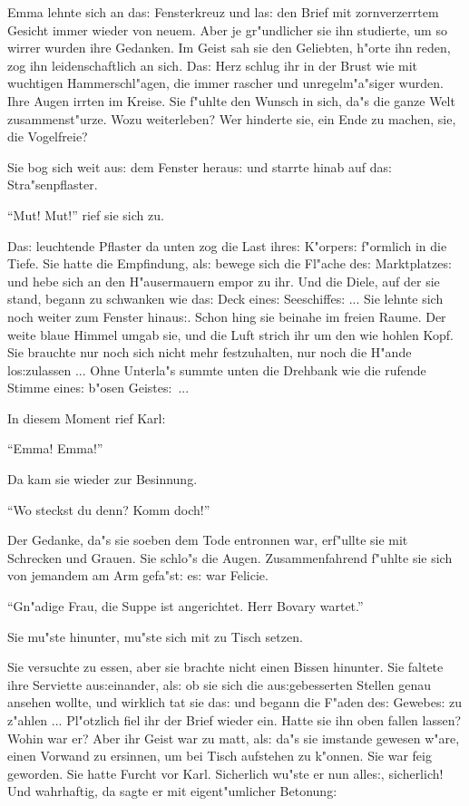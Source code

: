 \documentclass[oneside,12pt]{book}
\newcommand{\s}{s:}%
\begin{document}
Emma lehnte sich an da{\s} Fensterkreuz und la{\s} den Brief mit
zornverzerrtem Gesicht immer wieder von neuem. Aber je
gr"undlicher sie ihn studierte, um so wirrer wurden ihre Gedanken.
Im Geist sah sie den Geliebten, h"orte ihn reden, zog ihn
leidenschaftlich an sich. Da{\s} Herz schlug ihr in der Brust wie
mit wuchtigen Hammerschl"agen, die immer rascher und
unregelm"a"siger wurden. Ihre Augen irrten im Kreise. Sie f"uhlte
den Wunsch in sich, da"s die ganze Welt zusammenst"urze. Wozu
weiterleben? Wer hinderte sie, ein Ende zu machen, sie, die
Vogelfreie?

Sie bog sich weit au{\s} dem Fenster herau{\s} und starrte hinab
auf da{\s} Stra"senpflaster.

"`Mut! Mut!"' rief sie sich zu.

Da{\s} leuchtende Pflaster da unten zog die Last ihre{\s}
K"orper{\s} f"ormlich in die Tiefe. Sie hatte die Empfindung,
al{\s} bewege sich die Fl"ache de{\s} Marktplatze{\s} und hebe
sich an den H"ausermauern empor zu ihr. Und die Diele, auf der sie
stand, begann zu schwanken wie da{\s} Deck eine{\s} Seeschiffe{\s}
... Sie lehnte sich noch weiter zum Fenster hinau{\s}. Schon hing
sie beinahe im freien Raume. Der weite blaue Himmel umgab sie, und
die Luft strich ihr um den wie hohlen Kopf. Sie brauchte nur noch
sich nicht mehr fest\/zuhalten, nur noch die H"ande lo{\s}zulassen
... Ohne Unterla"s summte unten die Drehbank wie die rufende
Stimme eine{\s} b"osen Geiste{\s}~...

In diesem Moment rief Karl:

"`Emma! Emma!"'

Da kam sie wieder zur Besinnung.

"`Wo steckst du denn? Komm doch!"'

Der Gedanke, da"s sie soeben dem Tode entronnen war, erf"ullte sie
mit Schrecken und Grauen. Sie schlo"s die Augen. Zusammenfahrend
f"uhlte sie sich von jemandem am Arm gefa"st: e{\s} war Felicie.

"`Gn"adige Frau, die Suppe ist angerichtet. Herr Bovary wartet."'

Sie mu"ste hinunter, mu"ste sich mit zu Tisch setzen.

Sie versuchte zu essen, aber sie brachte nicht einen Bissen
hinunter. Sie faltete ihre Serviette au{\s}einander, al{\s} ob sie
sich die au{\s}gebesserten Stellen genau ansehen wollte, und
wirklich tat sie da{\s} und begann die F"aden de{\s} Gewebe{\s} zu
z"ahlen ... Pl"otzlich fiel ihr der Brief wieder ein. Hatte sie
ihn oben fallen lassen? Wohin war er? Aber ihr Geist war zu matt,
al{\s} da"s sie imstande gewesen w"are, einen Vorwand zu ersinnen,
um bei Tisch aufstehen zu k"onnen. Sie war feig geworden. Sie
hatte Furcht vor Karl. Sicherlich wu"ste er nun alle{\s},
sicherlich! Und wahrhaftig, da sagte er mit eigent"umlicher
Betonung:
\end{document}
